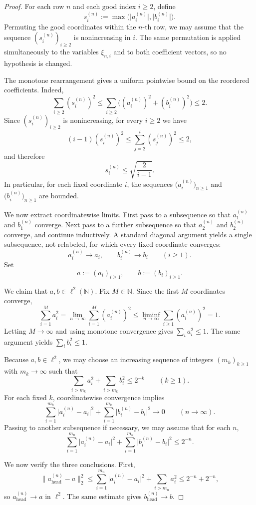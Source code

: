 \documentclass[11pt]{amsart}
\numberwithin{equation}{section}
\theoremstyle{definition}
\theoremstyle{remark}
\newcommand{\N}{\mathbb N}
\newcommand{\abs}[1]{\lvert #1 \rvert}
\newcommand{\norm}[1]{\lVert #1 \rVert}
\begin{document}
\begin{proof}
For each row $n$ and each good index $i\ge2$, define
\[
s_i^{(n)}:=\max\bigl(\abs{a_i^{(n)}},\abs{b_i^{(n)}}\bigr).
\]
Permuting the good coordinates within the $n$-th row, we may assume that the
sequence $(s_i^{(n)})_{i\ge2}$ is nonincreasing in $i$.  The same permutation
is applied simultaneously to the variables $\xi_{n,i}$ and to both coefficient
vectors, so no hypothesis is changed.

The monotone rearrangement gives a uniform pointwise bound on the reordered
coefficients.  Indeed,
\[
\sum_{i\ge2}(s_i^{(n)})^2
\le
\sum_{i\ge2}\bigl((a_i^{(n)})^2+(b_i^{(n)})^2\bigr)
\le 2.
\]
Since $(s_i^{(n)})_{i\ge2}$ is nonincreasing, for every $i\ge2$ we have
\[
(i-1)(s_i^{(n)})^2
\le \sum_{j=2}^{i}(s_j^{(n)})^2
\le 2,
\]
and therefore
\[
s_i^{(n)}\le \sqrt{\frac{2}{i-1}}.
\]
In particular, for each fixed coordinate $i$, the sequences
$\bigl(a_i^{(n)}\bigr)_{n\ge1}$ and $\bigl(b_i^{(n)}\bigr)_{n\ge1}$ are
bounded.

We now extract coordinatewise limits.  First pass to a subsequence so that
$a_1^{(n)}$ and $b_1^{(n)}$ converge.  Next pass to a further subsequence so
that $a_2^{(n)}$ and $b_2^{(n)}$ converge, and continue inductively.  A
standard diagonal argument yields a single subsequence, not relabeled, for
which every fixed coordinate converges:
\[
a_i^{(n)}\to a_i,
\qquad
b_i^{(n)}\to b_i
\qquad(i\ge1).
\]
Set
\[
a:=(a_i)_{i\ge1},
\qquad
b:=(b_i)_{i\ge1}.
\]

We claim that $a,b\in\ell^2(\N)$.  Fix $M\in\N$.  Since the first $M$
coordinates converge,
\[
\sum_{i=1}^{M} a_i^2
=\lim_{n\to\infty}\sum_{i=1}^{M}(a_i^{(n)})^2
\le \liminf_{n\to\infty}\sum_{i\ge1}(a_i^{(n)})^2
=1.
\]
Letting $M\to\infty$ and using monotone convergence gives
$\sum_i a_i^2\le1$.  The same argument yields $\sum_i b_i^2\le1$.

Because $a,b\in\ell^2$, we may choose an increasing sequence of integers
$(m_k)_{k\ge1}$ with $m_k\to\infty$ such that
\[
\sum_{i>m_k} a_i^2+\sum_{i>m_k} b_i^2\le 2^{-k}
\qquad(k\ge1).
\]
For each fixed $k$, coordinatewise convergence implies
\[
\sum_{i=1}^{m_k}\abs{a_i^{(n)}-a_i}^2
+
\sum_{i=1}^{m_k}\abs{b_i^{(n)}-b_i}^2
\longrightarrow0
\qquad(n\to\infty).
\]
Passing to another subsequence if necessary, we may assume that for each $n$,
\[
\sum_{i=1}^{m_n}\abs{a_i^{(n)}-a_i}^2
+
\sum_{i=1}^{m_n}\abs{b_i^{(n)}-b_i}^2
\le 2^{-n}.
\]

We now verify the three conclusions.  First,
\[
\norm{a_{\mathrm{head}}^{(n)}-a}_2^2
\le
\sum_{i=1}^{m_n}\abs{a_i^{(n)}-a_i}^2
+
\sum_{i>m_n}a_i^2
\le 2^{-n}+2^{-n},
\]
so $a_{\mathrm{head}}^{(n)}\to a$ in $\ell^2$.  The same estimate gives
$b_{\mathrm{head}}^{(n)}\to b$.


\end{proof}
\end{document}
